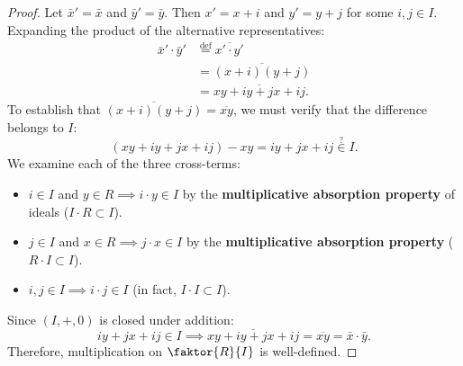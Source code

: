 \begin{content}
\end{content}

\begin{content}

\begin{proof}
Let $\bar{x}' = \bar{x}$ and $\bar{y}' = \bar{y}$. Then $x' = x + i$ and $y' = y + j$ for some $i, j \in I$. Expanding the product of the alternative representatives:
\begin{align*}
\bar{x}' \cdot \bar{y}' &\stackrel{\text{def}}{=} \overline{x' \cdot y'} \\
&= \overline{(x + i)(y + j)} \\
&= \overline{x y + i y + j x + i j}.
\end{align*}
To establish that $\overline{(x + i)(y + j)} = \overline{x y}$, we must verify that the difference belongs to $I$:
\[
(x y + i y + j x + i j) - x y = i y + j x + i j \stackrel{?}{\in} I.
\]
We examine each of the three cross-terms:
\begin{itemize}
    \item $i \in I$ and $y \in R \implies i \cdot y \in I$ by the \textbf{multiplicative absorption property} of ideals ($I \cdot R \subset I$).
    \item $j \in I$ and $x \in R \implies j \cdot x \in I$ by the \textbf{multiplicative absorption property} ($R \cdot I \subset I$).
    \item $i, j \in I \implies i \cdot j \in I$ (in fact, $I \cdot I \subset I$).
\end{itemize}
Since $(I, +, 0)$ is closed under addition:
\[
i y + j x + i j \in I \implies \overline{x y + i y + j x + i j} = \overline{x y} = \bar{x} \cdot \bar{y}.
\]
Therefore, multiplication on $\faktor{R}{I}$ is well-defined.
\end{proof}


\end{content}
